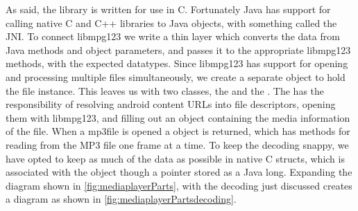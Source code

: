 As said, the library is written for use in C. Fortunately Java has
support for calling native C and C++ libraries to Java objects, with
something called the \ac{JNI}. To connect libmpg123 we write a thin
layer which converts the data from Java methods and object parameters,
and passes it to the appropriate libmpg123 methods, with the expected
datatypes. Since libmpg123 has support for opening and processing
multiple files simultaneously, we create a separate object to hold the
file instance. This leaves us with two classes, the 
and the . The  has the responsibility
of resolving android content URLs into file descriptors, opening them
with libmpg123, and filling out an object containing the media
information of the file. When a mp3file is opened a 
object is returned, which has methods for reading from the MP3 file one
frame at a time. To keep the decoding snappy, we have opted to keep as
much of the data as possible in native C structs, which is associated
with the  object though a pointer stored as a Java long.
Expanding the diagram shown in \cref{fig:mediaplayerParts}, with the
decoding just discussed creates a diagram as shown in
\cref{fig:mediaplayerPartsdecoding}.

